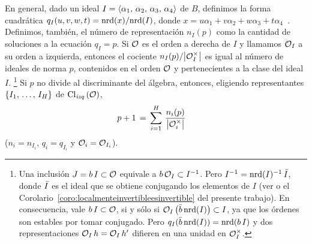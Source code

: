 En general, dado un ideal
\begin{math}
	I=\generado{\alpha_{1},\,\alpha_{2},\,\alpha_{3},\,\alpha_{4}}
\end{math}
de $B$, definimos la forma cuadr\'{a}tica $q_{I}(u,v,w,t)=\nrd(x)/\nrd(I)$,
donde
\begin{math}
	x=u\alpha_{1}+v\alpha_{2}+w\alpha_{3}+t\alpha_{4}
\end{math}~.
Definimos, tambi\'{e}n, el n\'{u}mero de representaci\'{o}n $n_{I}(p)$ como la
cantidad de soluciones a la ecuaci\'{o}n $q_{I}=p$. Si $\cal{O}$ es el orden a
derecha de $I$ y llamamos $\cal{O}_{I}$ a su orden a izquierda, entonces el
cociente
\begin{math}
	n_{I}(p)/\big|\cal{O}_{I}^{\times}\big|
\end{math}
es igual al n\'{u}mero de ideales de norma $p$, contenidos en el orden
$\cal{O}$ y pertenecientes a la clase del ideal $I$.%
\footnote{
	Una inclusi\'{o}n $J=b\,I\subset\cal{O}$ equivale a
	$b\,\cal{O}_{I}\subset I^{-1}$. Pero $I^{-1}=\nrd(I)^{-1}\,\conj{I}$,
	donde $\conj{I}$ es el ideal que se obtiene conjugando los elementos de
	$I$ (ver \cite[Propo.~1.17]{PizerAlgo} o el
	Corolario~\ref{coro:localmenteinvertibleesinvertible} del presente
	trabajo). En consecuencia, vale $b\,I\subset\cal{O}$, si y s\'{o}lo si
	$\cal{O}_{I}\,\big(\conj{b}\,\nrd(I)\big)\subset I$, ya que los
	\'{o}rdenes son estables por tomar conjugado. Pero
	$q_{I}(\conj{b}\,\nrd(I))=\nrd(b\,I)$ y dos representaciones
	$\cal{O}_{I}\,h=\cal{O}_{I}\,h'$ difieren en una unidad en
	$\cal{O}_{I}^{\times}$.
}
Si $p$ no divide al discriminante del \'{a}lgebra, entonces, eligiendo
representantes $\{\lista{I}{H}\}$ de $\lClass{\cal{O}}$,
\begin{align*}
	p+1 & \,=\,\sum_{i=1}^{H}\,\frac{n_{i}(p)}{%
		\big|\cal{O}_{i}^{\times}\big|}
\end{align*}
%
($n_{i}=n_{I_{i}}$, $q_{i}=q_{I_{i}}$ y $\cal{O}_{i}=\cal{O}_{I_{i}}$).

